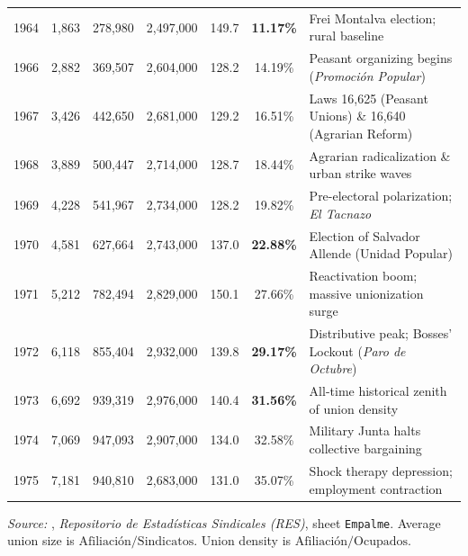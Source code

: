 \begin{table}[htbp]
\begin{tabularx}{\textwidth}{lcccccX}
1964 & 1,863 & 278,980 & 2,497,000 & 149.7 & \textbf{11.17\%} & Frei Montalva election; rural baseline \\
1966 & 2,882 & 369,507 & 2,604,000 & 128.2 & 14.19\% & Peasant organizing begins (\textit{Promoción Popular}) \\
1967 & 3,426 & 442,650 & 2,681,000 & 129.2 & 16.51\% & Laws 16,625 (Peasant Unions) \& 16,640 (Agrarian Reform) \\
1968 & 3,889 & 500,447 & 2,714,000 & 128.7 & 18.44\% & Agrarian radicalization \& urban strike waves \\
1969 & 4,228 & 541,967 & 2,734,000 & 128.2 & 19.82\% & Pre-electoral polarization; \textit{El Tacnazo} \\
1970 & 4,581 & 627,664 & 2,743,000 & 137.0 & \textbf{22.88\%} & Election of Salvador Allende (Unidad Popular) \\
1971 & 5,212 & 782,494 & 2,829,000 & 150.1 & 27.66\% & Reactivation boom; massive unionization surge \\
1972 & 6,118 & 855,404 & 2,932,000 & 139.8 & \textbf{29.17\%} & Distributive peak; Bosses' Lockout (\textit{Paro de Octubre}) \\
1973 & 6,692 & 939,319 & 2,976,000 & 140.4 & \textbf{31.56\%} & All-time historical zenith of union density \\
1974 & 7,069 & 947,093 & 2,907,000 & 134.0 & 32.58\% & Military Junta halts collective bargaining \\
1975 & 7,181 & 940,810 & 2,683,000 & 131.0 & 35.07\% & Shock therapy depression; employment contraction \\
\bottomrule
\end{tabularx}
\begin{minipage}{\textwidth}
\vspace{0.3em}
\footnotesize
\textit{Source:} \citet{OsorioPolanco2021}, \textit{Repositorio de Estadísticas Sindicales (RES)}, sheet \texttt{Empalme}. Average union size is $\text{Afiliación} / \text{Sindicatos}$. Union density is $\text{Afiliación} / \text{Ocupados}$.
\end{minipage}
\end{table}
